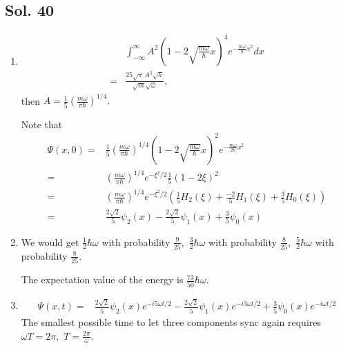     \subsection*{Sol. 40}
    \begin{enumerate}
        \item 
        \begin{align*}
             & \int_{-\infty}^\infty
            A^2\left(1-2\sqrt{\frac{m\omega}{\hbar}}x\right)^4
            e^{-\frac{m\omega}{\hbar}x^2}dx\\
            =& 
            \frac{25 \sqrt{\pi} \, A^{2} \sqrt{h}}{\sqrt{m} \sqrt{\omega}},
        \end{align*}
        then $A= \frac{1}{5}\left(\frac{m\omega}{\pi\hbar}\right)^{1/4}.$

        Note that 
        \begin{align*}
             \Psi(x,0)=& \frac{1}{5}\left(\frac{m\omega}{\pi\hbar}\right)^{1/4}
            \left(1-2\sqrt{\frac{m\omega}{\hbar}}x\right)^2
            e^{-\frac{m\omega}{2\hbar}x^2}\\
            =& 
            \left(\frac{m\omega}{\pi\hbar}\right)^{1/4}
            e^{-\xi^2/2}
            \frac{1}{5}(1-2\xi )^2\\
            =&\left(\frac{m\omega}{\pi\hbar}\right)^{1/4}
            e^{-\xi^2/2}
            (\frac{1}{5}H_2(\xi) + 
            \frac{-2}{5}H_1(\xi) +
            \frac{3}{5}H_0(\xi))\\
            =& \frac{2\sqrt{2}}{5}\psi_2(x)
            -\frac{2\sqrt{2}}{5}\psi_1(x)+
            \frac{3}{5}\psi_0(x)
        \end{align*}
        \item We
        would get $\frac{1}{2}\hbar\omega$ with probability $\frac{9}{25},$ 
        $\frac{3}{2}\hbar\omega$ with probability $\frac{8}{25},$
        $\frac{5}{2}\hbar\omega$ with probability $\frac{8}{25}.$

        The expectation value of the energy is $\frac{73}{50}\hbar\omega.$
        \item 
        \begin{align*}
            \Psi(x,t) =& 
            \frac{2\sqrt{2}}{5}\psi_2(x)e^{-i5\omega t/2}
            -\frac{2\sqrt{2}}{5}\psi_1(x)e^{-i3\omega t/2}+
            \frac{3}{5}\psi_0(x)e^{-i\omega t/2}
        \end{align*}
        The smallest possible time to let three components sync again requires $\omega T=2\pi,$ $T=\frac{2\pi}{\omega}.$
        
    \end{enumerate}

